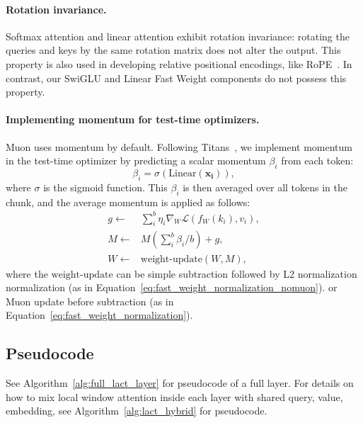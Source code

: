 \documentclass{article}
\begin{document}
\paragraph{Rotation invariance.} Softmax attention and linear attention exhibit rotation invariance: rotating the queries and keys by the same rotation matrix does not alter the output. This property is also used in developing relative positional encodings, like RoPE~\cite{su2023roformer}. In contrast, our SwiGLU and Linear Fast Weight components do not possess this property.

\paragraph{Implementing momentum for test-time optimizers.}  \label{paragraph:momentum}
Muon uses momentum by default. Following Titans~\cite{behrouz2024titans}, we implement momentum in the test-time optimizer by predicting a scalar momentum $\beta_i$ from each token: 
\begin{equation}
    \beta_i = \sigma(\text{Linear}(\boldsymbol{x_i})), 
\end{equation}
where $\sigma$ is the sigmoid function.  This $\beta_i$ is then averaged over all tokens in the chunk, and the average momentum is applied as follows:
\begin{equation}
\begin{aligned}
    g \leftarrow&  \sum_i^b \eta_i \nabla_W \mathcal{L}(f_W(k_i), v_i), \\
    M \leftarrow&  M (\sum_i^b \beta_i / b) + g, \\
    W \leftarrow& \text{weight-update}(W, M),
\end{aligned}
\end{equation}
where the $\text{weight-update}$ can be simple subtraction followed by L2 normalization normalization (as in Equation~\ref{eq:fast_weight_normalization_nomuon}). or Muon update before subtraction (as in Equation~\ref{eq:fast_weight_normalization}).

\subsection{Pseudocode}
\label{sec:ttt_pseudocode}

See Algorithm~\ref{alg:full_lact_layer} for pseudocode of a full \methodname{} layer. 
For details on how to mix local window attention inside each layer with shared query, value, embedding, see Algorithm~\ref{alg:lact_hybrid} for pseudocode. 
\end{document}
